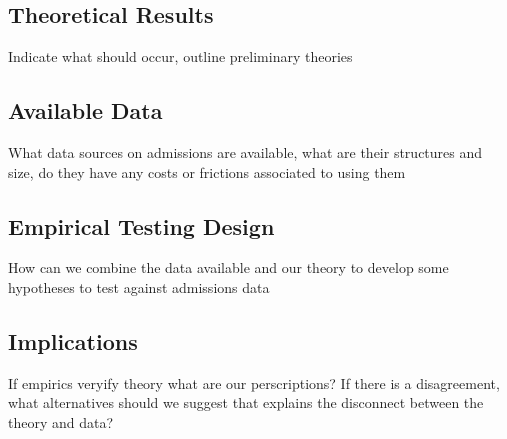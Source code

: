 \documentclass[10pt]{article}
\begin{document}
\subsection*{Theoretical Results}

{\color{red} Indicate what should occur, outline preliminary theories}

\subsection*{Available Data}

{\color{red} What data sources on admissions are available, what are their structures and size, do they have any costs or frictions associated to using them}

\subsection*{Empirical Testing Design}

{\color{red} How can we combine the data available and our theory to develop some hypotheses to test against admissions data}

\subsection*{Implications}

{\color{red} If empirics veryify theory what are our perscriptions? If there is a disagreement, what alternatives should we suggest that explains the disconnect between the theory and data?}

%
\end{document}
